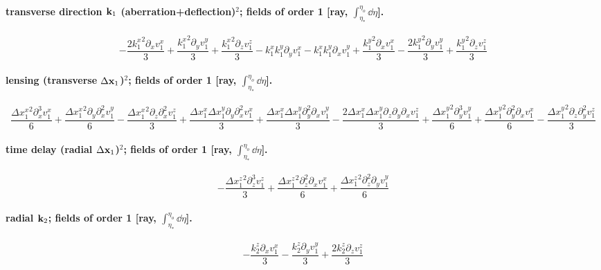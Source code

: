 \paragraph{transverse direction $\mathbf k_1$ (aberration+deflection)${}^2$; fields of order 1 [ray, $\int_{\eta_*}^{\eta_o}\dd\eta$].}
\begin{dmath*}- \frac{2 {k^{x}_{1}}^{2} \partial_x  {v^{x}_{1}}}{3} + \frac{{k^{x}_{1}}^{2} \partial_y  {v^{y}_{1}}}{3} + \frac{{k^{x}_{1}}^{2} \partial_z  {v^{z}_{1}}}{3} - {k^{x}_{1}} {k^{y}_{1}} \partial_y  {v^{x}_{1}} - {k^{x}_{1}} {k^{y}_{1}} \partial_x  {v^{y}_{1}} + \frac{{k^{y}_{1}}^{2} \partial_x  {v^{x}_{1}}}{3} - \frac{2 {k^{y}_{1}}^{2} \partial_y  {v^{y}_{1}}}{3} + \frac{{k^{y}_{1}}^{2} \partial_z  {v^{z}_{1}}}{3}\end{dmath*}
\paragraph{lensing (transverse $\Delta\mathbf x_1$)${}^2$; fields of order 1 [ray, $\int_{\eta_*}^{\eta_o}\dd\eta$].}
\begin{dmath*}\frac{{\Delta x^{x}_{1}}^{2} \partial_{x}^{3}  {v^{x}_{1}}}{6} + \frac{{\Delta x^{x}_{1}}^{2} \partial_{y}\partial_{x}^{2}  {v^{y}_{1}}}{6} - \frac{{\Delta x^{x}_{1}}^{2} \partial_{z}\partial_{x}^{2}  {v^{z}_{1}}}{3} + \frac{{\Delta x^{x}_{1}} {\Delta x^{y}_{1}} \partial_{y}\partial_{x}^{2}  {v^{x}_{1}}}{3} + \frac{{\Delta x^{x}_{1}} {\Delta x^{y}_{1}} \partial_{y}^{2}\partial_{x}  {v^{y}_{1}}}{3} - \frac{2 {\Delta x^{x}_{1}} {\Delta x^{y}_{1}} \partial_{z}\partial_{y}\partial_{x}  {v^{z}_{1}}}{3} + \frac{{\Delta x^{y}_{1}}^{2} \partial_{y}^{3}  {v^{y}_{1}}}{6} + \frac{{\Delta x^{y}_{1}}^{2} \partial_{y}^{2}\partial_{x}  {v^{x}_{1}}}{6} - \frac{{\Delta x^{y}_{1}}^{2} \partial_{z}\partial_{y}^{2}  {v^{z}_{1}}}{3}\end{dmath*}
\paragraph{time delay (radial $\Delta\mathbf x_1$)${}^2$; fields of order 1 [ray, $\int_{\eta_*}^{\eta_o}\dd\eta$].}
\begin{dmath*}- \frac{{\Delta x^{z}_{1}}^{2} \partial_{z}^{3}  {v^{z}_{1}}}{3} + \frac{{\Delta x^{z}_{1}}^{2} \partial_{z}^{2}\partial_{x}  {v^{x}_{1}}}{6} + \frac{{\Delta x^{z}_{1}}^{2} \partial_{z}^{2}\partial_{y}  {v^{y}_{1}}}{6}\end{dmath*}
\paragraph{radial $\mathbf k_2$; fields of order 1 [ray, $\int_{\eta_*}^{\eta_o}\dd\eta$].}
\begin{dmath*}- \frac{{k^{z}_{2}} \partial_x  {v^{x}_{1}}}{3} - \frac{{k^{z}_{2}} \partial_y  {v^{y}_{1}}}{3} + \frac{2 {k^{z}_{2}} \partial_z  {v^{z}_{1}}}{3}\end{dmath*}
